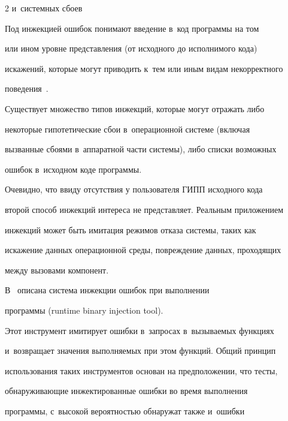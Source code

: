 \begin{multicols}{2}
{и~системных сбоев}





\vspace*{-1pt}


    


    Под инжекцией ошибок понимают введение в~код программы на том 


или ином уровне представления (от исходного до исполнимого кода) 


искажений, которые могут приводить к~тем или иным видам некорректного 


поведения~\cite{8-bf}.


    


    Существует множество типов инжекций, которые могут отражать либо 


некоторые гипотетические сбои в~операционной системе (включая 


вызванные сбоями в~аппаратной части системы), либо списки возможных 


ошибок в~исходном коде программы.


    


    Очевидно, что ввиду отсутствия у пользователя ГИПП исходного кода 


второй способ инжекций интереса не представляет. Реальным приложением 


инжекций может быть имитация режимов отказа системы, таких как 


искажение данных операционной среды, повреждение данных, проходящих 


между вызовами компонент.


    


    В~\cite{10-bf} описана система инжекции ошибок при выполнении 


программы (runtime binary injection tool).




    Этот инструмент имитирует ошибки в~запросах в~вызываемых функциях 


и~возвращает значения выполняемых при этом функций. Общий принцип 


использования таких инструментов основан на предположении, что тесты, 


обнаруживающие инжектированные ошибки во время выполнения 


программы, с~высокой вероятностью обнаружат также и~ошибки 



\end{multicols}
